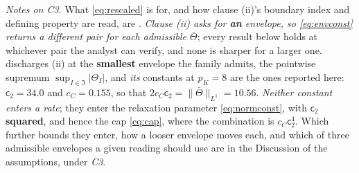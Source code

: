 \noindent\emph{Notes on C3.} What \eqref{eq:rescaled} is for, and how clause (ii)'s boundary index and
defining property are read, are . \emph{Clause \textup{(ii)} asks for
\textbf{an} envelope, so \eqref{eq:envconst} returns a different pair for each admissible $\bar\Theta$};
every result below holds at whichever pair the analyst can verify, and none is sharper for a larger one.
 discharges \textup{(ii)} at the \textbf{smallest} envelope the family admits,
the pointwise supremum $\sup_{I\in\mathfrak I}|\Theta_I|$, and \emph{its} constants at $p_K=8$ are the
ones reported here: $\mathsf c_2=34.0$ and $c_C=0.155$, so that
$2c_C\mathsf c_2=\|\bar\Theta\|_{L^{1}}=10.56$. \emph{Neither constant enters a rate}; they enter the
relaxation parameter \eqref{eq:normconst}, with $\mathsf c_2$ \textbf{squared}, and hence the cap
\eqref{eq:cap}, where the combination is $c_C\mathsf c_2^{4}$. Which further bounds they enter, how a
looser envelope moves each, and which of three admissible envelopes a given reading should use are in
the Discussion of the assumptions, under \emph{C3}.

